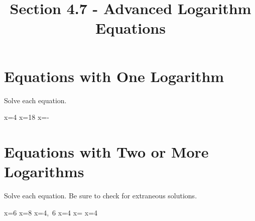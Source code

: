 

\title{Section 4.7 - Advanced Logarithm Equations}


\maketitle

\section*{Equations with One Logarithm}
Solve each equation.
\begin{smenum}
\maitemxxx
{x=4}
{x=18}
{x=-}
\end{smenum}

\section*{Equations with Two or More Logarithms}
Solve each equation. Be sure to check for extraneous solutions.
\begin{smenum}
\maitemxx
{x=6}
{x=8}
\maitemxx
{x=4,\ 6}
{x=4}
\maitemxx
{x=}
{x=4}
\end{smenum}

